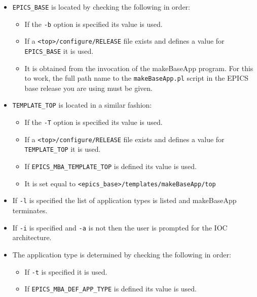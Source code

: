 \begin{itemize}
\item \verb|EPICS_BASE| is located by checking the following in order:

\begin{itemize}
\item If the \verb|-b| option is specified its value is used.

\item If a \verb|<top>/configure/RELEASE| file exists and defines a value for \verb|EPICS_BASE| it is used.

\item It is obtained from the invocation of the makeBaseApp program.
For this to work, the full path name to the \verb|makeBaseApp.pl| script in the EPICS base release you are using must be given.
\end{itemize}

\item \verb|TEMPLATE_TOP| is located in a similar fashion:

\begin{itemize}
\item If the \verb|-T| option is specified its value is used.

\item If a \verb|<top>/configure/RELEASE| file exists and defines a value for \verb|TEMPLATE_TOP| it is used.

\item If \verb|EPICS_MBA_TEMPLATE_TOP| is defined its value is used.

\item It is set equal to \verb|<epics_base>/templates/makeBaseApp/top|
\end{itemize}

\item If \verb|-l| is specified the list of application types is listed and makeBaseApp terminates.

\item If \verb|-i| is specified and \verb|-a| is not then the user is prompted for the IOC architecture.

\item The application type is determined by checking the following in order:

\begin{itemize}
\item If \verb|-t| is specified it is used.

\item If \verb|EPICS_MBA_DEF_APP_TYPE| is defined its value is used.


\end{itemize}
\end{itemize}
